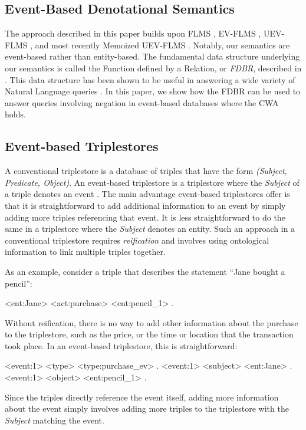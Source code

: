 \documentclass[../main.tex]{subfiles}
\begin{document}
\begin{refsection}

\section{Event-Based Denotational Semantics}
\label{sec:event}

\noindent The approach described in this paper builds upon FLMS \cite{frost1989constructing}, EV-FLMS \cite{frost2014demonstration}, UEV-FLMS \cite{peelar2016accommodating}, and most recently
Memoized UEV-FLMS \cite{peelar2020webistjournal}.  Notably, our semantics are event-based rather than entity-based.  The fundamental data structure underlying our semantics is called the Function defined by a Relation, or \textit{FDBR}, described in .  This data structure has been shown to be useful in answering a wide variety of Natural Language queries \cite{frostpeelar2019}.  In this paper, we show how the FDBR can be used to answer queries involving negation in event-based databases where the CWA holds.

\subsection{Event-based Triplestores}

A conventional triplestore is a database of triples that have the form \textit{(Subject, Predicate, Object)}.
An event-based triplestore is a triplestore where the \textit{Subject} of a triple denotes an event \cite{frost2013event}\cite{frost2014demonstration}.
The main advantage event-based triplestores offer is that it is straightforward to add additional
information to an event by simply adding more triples referencing that event.  It is less straightforward to do the same in a triplestore where the \textit{Subject} denotes an entity.
Such an approach in a conventional triplestore requires \textit{reification} and involves using ontological information to link multiple triples together.

As an example, consider a triple that describes the statement ``Jane bought a pencil'':
\begin{code}
    <ent:Jane> <act:purchase> <ent:pencil_1> .
\end{code}
Without reification, there is no way to add other information about the purchase to the triplestore, such as the price, or the time or location that the transaction took place.
In an event-based triplestore, this is straightforward:
\begin{code}
    <event:1> <type> <type:purchase_ev> .
    <event:1> <subject> <ent:Jane> .
    <event:1> <object> <ent:pencil_1> .
\end{code}
Since the triples directly reference the event itself, adding more information about the event simply involves adding more triples to the triplestore with the \textit{Subject} matching the event.


\end{refsection}
\end{document}
